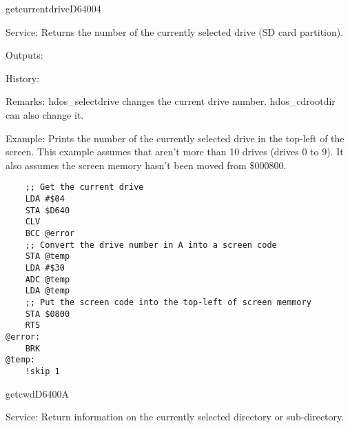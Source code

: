 \newpage
\begin{hyppotrap}{getcurrentdrive}{D640}{04}
\item [Service:]
  Returns the number of the currently selected drive (SD card partition).
\item [Outputs:]
\item [History:]
\item [Remarks:]
  hdos\_selectdrive changes the current drive number. hdos\_cdrootdir
  can also change it.
\item [Example:]
  Prints the number of the currently selected drive in the top-left of the
  screen. This example assumes that aren't more than 10 drives (drives 0 to 9).
  It also assumes the screen memory hasn't been moved from \$000800.
\begin{tcolorbox}[colback=black,coltext=white]
\verbatimfont{\codefont}
\begin{verbatim}
    ;; Get the current drive
    LDA #$04
    STA $D640
    CLV
    BCC @error
    ;; Convert the drive number in A into a screen code
    STA @temp
    LDA #$30
    ADC @temp
    LDA @temp
    ;; Put the screen code into the top-left of screen memmory
    STA $0800
    RTS
@error:
    BRK
@temp:
    !skip 1
\end{verbatim}
\end{tcolorbox}
\end{hyppotrap}


\newpage
\begin{hyppotrap}{getcwd}{D640}{0A}
\item [Service:]
  Return information on the currently selected directory or sub-directory.
\notimplemented
\end{hyppotrap}


